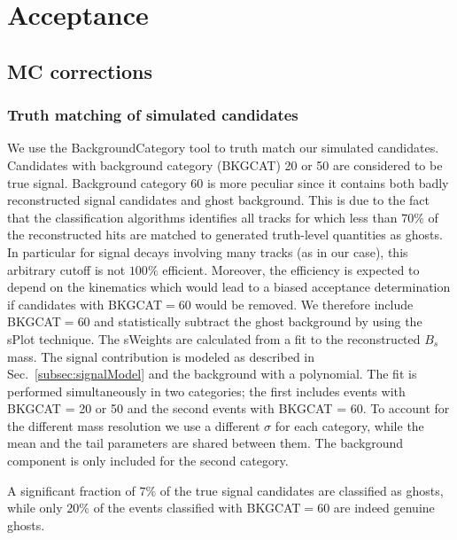 \section{Acceptance}
\label{sec:Acceptance}

\subsection{MC corrections}

\subsubsection{Truth matching of simulated candidates}

We use the \textsf{BackgroundCategory} tool to truth match our simulated candidates. 
Candidates with background category (\textsf{BKGCAT}) 20 or 50 are considered to be true signal. 
Background category 60 is more peculiar since it contains both badly reconstructed
signal candidates and ghost background.
This is due to the fact that the classification algorithms identifies all tracks 
for which less than $70\%$ of the reconstructed hits are matched to generated truth-level quantities as ghosts.
In particular for signal decays involving many tracks (as in our case),
this arbitrary cutoff is not $100\%$ efficient.
Moreover, the efficiency is expected to depend on the kinematics which would lead to a biased acceptance determination
if candidates with \textsf{BKGCAT}$=60$ would be removed. 
We therefore include \textsf{BKGCAT}$=60$ and statistically subtract the ghost background by using the \textsf{sPlot} technique.
The \textsf{sWeights} are calculated from a fit to the reconstructed $B_s$ mass.  
The signal contribution is modeled as described in Sec.~\ref{subsec:signalModel} and the background with a polynomial.
The fit is performed simultaneously in two categories; the first includes events with \textsf{BKGCAT} = 20 or 50 and
the second events with \textsf{BKGCAT}  = 60.
To account for the different mass resolution we use a different $\sigma$ for each category,
while the mean and the tail parameters are shared between them. 
The background component is only included for the second category.

A significant fraction of $7\%$ of the true signal candidates are classified as ghosts,
while only $20 \%$ of the events classified with \textsf{BKGCAT}$=60$ are indeed genuine ghosts.


